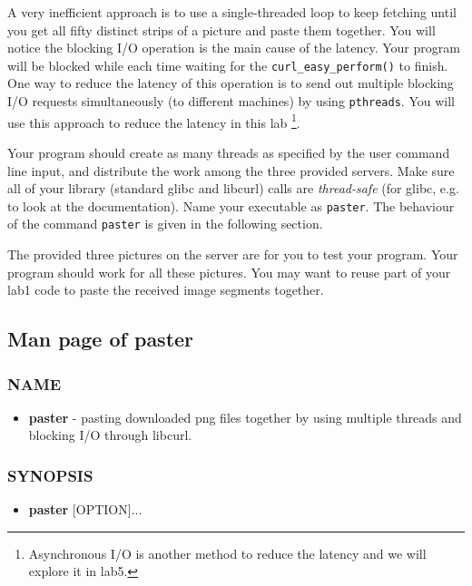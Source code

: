 A very inefficient approach is to use a single-threaded loop to keep fetching until you get all fifty distinct strips of a picture and paste them together. You will notice the blocking I/O operation is the main cause of the latency. Your program will be blocked while each time waiting for the \verb+curl_easy_perform()+ to finish. One way to reduce the latency of this operation is to send out multiple blocking I/O requests simultaneously (to different machines) by using \verb+pthreads+. You will use this approach to reduce the latency in this lab
\footnote{Asynchronous I/O is another method to reduce the latency and we will explore it in lab5.}. 

Your program should create as many threads as specified by the user command line input, and distribute the work among the three provided servers. Make sure all of your library (standard glibc and libcurl) calls are {\em thread-safe} (for glibc, e.g.  to look at the documentation). Name your executable as \verb+paster+. The behaviour of the command \verb+paster+ is given in the following section.

The provided three pictures on the server are for you to test your program. Your program should work for all these pictures. You may want to reuse part of your lab1 code to paste the received image segments together. 

\subsection{Man page of paster}
\label{sec:man_paster_par}

\subsubsection*{NAME}
\begin{itemize}
    \item[]{\bf paster} - pasting downloaded png files together
        by using multiple threads and blocking I/O through libcurl.
\end{itemize}

\subsubsection*{SYNOPSIS}

\begin{itemize}
\item []{\bf paster} [OPTION]...
\end{itemize}

